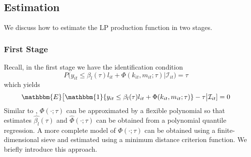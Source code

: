 \documentclass[11pt]{article}
\begin{document}
\subsection{Estimation}
We discuss how to estimate the LP production function in two stages. 
\subsubsection*{First Stage}
Recall, in the first stage we have the identification condition
\begin{equation} 
	P\big(y_{it}\leq \beta_{l}(\tau)l_{it}+\Phi(k_{it}, m_{it}; \tau)\big|\mathcal{I}_{it})=\tau
\end{equation}
which yields
\begin{equation} 
	\mathbbm{E}\big[\mathbbm{1}\{y_{it}\leq \beta_{l}(\tau)l_{it}+\Phi(k_{it}, m_{it}; \tau)\}-\tau\big|\mathcal{I}_{it}]=0
\end{equation}
Similar to \cite{Olley1996}, $\Phi(\cdot;\tau)$ can be approximated by a flexible polynomial so that estimates $\hat{\beta_{l}}(\tau)$ and $\hat{\Phi}(\cdot;\tau)$ can be obtained from a polynomial quantile regression. A more complete model of $\Phi(\cdot;\tau)$ can be obtained using a finite-dimensional sieve and estimated using a minimum distance criterion function. We briefly introduce this approach.\\
\end{document}
